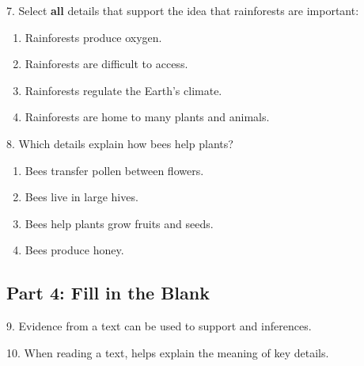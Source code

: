 \documentclass[12pt]{article}
\begin{document}
7. Select \textbf{all} details that support the idea that rainforests are important: \\
\begin{enumerate}[label=\Alph*.]
    \item Rainforests produce oxygen.  
    \item Rainforests are difficult to access.  
    \item Rainforests regulate the Earth’s climate.  
    \item Rainforests are home to many plants and animals.  
\end{enumerate}

\vspace{1cm}

8. Which details explain how bees help plants?\\
\begin{enumerate}[label=\Alph*.]
    \item Bees transfer pollen between flowers.  
    \item Bees live in large hives.  
    \item Bees help plants grow fruits and seeds.  
    \item Bees produce honey.  
\end{enumerate}

\vspace{1cm}

\subsection*{Part 4: Fill in the Blank}

9. Evidence from a text can be used to support \underline{\hspace{4cm}} and inferences.

\vspace{3cm}

10. When reading a text, \underline{\hspace{4cm}} helps explain the meaning of key details.

\vspace{3cm}
\end{document}
